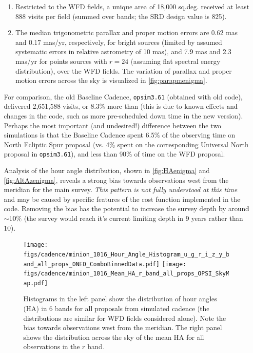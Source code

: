 \begin{enumerate}
\item Restricted to the WFD fields, a unique area of
18,000 sq.deg. received at least 888 visits per field (summed over bands;
the SRD design value is 825).
\item The median trigonometric parallax and proper motion errors are
0.62 mas and 0.17 mas/yr, respectively, for bright sources (limited by
assumed systematic errors in relative astrometry of 10 mas), and 7.9
mas and 2.3 mas/yr for points sources with $r=24$ (assuming flat
spectral energy distribution), over the WFD fields. The
variation of parallax and proper motion errors across the sky is
visualized in \autoref{fig:parapmenigma}.
\end{enumerate}





For comparison, the old Baseline Cadence, \texttt{opsim3.61}
(obtained with old \OpSim code), delivered 2,651,588 visits, or 8.3\%
more than   (this is due to known effects and
changes in the code,  such as more pre-scheduled down time in the new
version). Perhaps the most important (and undesired!) difference
between the two simulations is that the Baseline Cadence
spent 6.5\% of the observing time on North Ecliptic Spur proposal (vs.
4\% spent on the corresponding Universal North proposal in
\texttt{opsim3.61}), and less than 90\% of time on the WFD proposal.

Analysis of the hour angle distribution, shown in
\autoref{fig:HAenigma} and \autoref{fig:AltAzenigma}, reveals a strong
bias towards observations west from the meridian for the main survey.
{\it This pattern is not fully understood at this time} and may be
caused by specific features of the cost function implemented in the
\OpSim code. Removing the bias has the potential to increase the survey depth by around $\sim10\%$ (the survey would reach it's current limiting depth in 9 years rather than 10).



\begin{figure}[t!]
\vskip -0.0in
\texttt{[image: figs/cadence/minion\_1016\_Hour\_Angle\_Histogram\_u\_g\_r\_i\_z\_y\_band\_all\_props\_ONED\_ComboBinnedData.pdf]}
\texttt{[image: figs/cadence/minion\_1016\_Mean\_HA\_r\_band\_all\_props\_OPSI\_SkyMap.pdf]}
\vskip -0.1in
\caption{Histograms in the left panel show the distribution of hour angles (HA) in
6 bands for all proposals from simulated cadence  (the distributions are
similar for WFD fields considered alone). Note the bias towards observations west from
the meridian. The right panel shows the distribution across the sky of the mean HA for
all observations in the $r$ band. }
\label{fig:HAenigma}
\end{figure}

